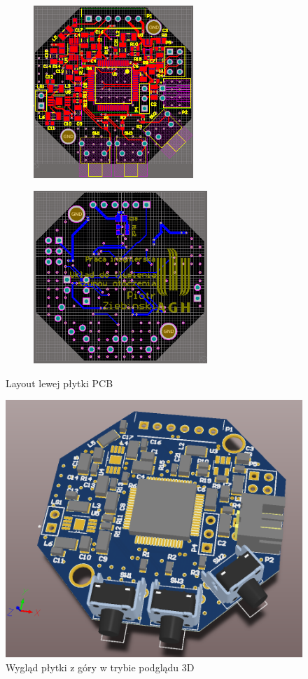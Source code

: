\begin{figure}[H]
	\centering
	\begin{subfigure}{.45\textwidth}
		\centering
		\includegraphics[height=6.5cm]{zdjecia/PCB/PCB_left_top.png}
	\end{subfigure}
	\begin{subfigure}{.45\textwidth}
		\centering
		\includegraphics[height=6.5cm]{zdjecia/PCB/PCB_left_bottom.png}
	\end{subfigure}
	\caption{\label{PCB_left} Layout lewej płytki PCB}
\end{figure}

\begin{figure}[H]
	\centering
	\includegraphics[scale=0.4]{zdjecia/PCB/PCB_left_3D.png}
	\caption{\label{PCB_left_3D} Wygląd płytki z góry w trybie podglądu 3D}
\end{figure}


